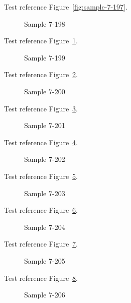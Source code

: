 Test reference Figure~\ref{fig:sample-7-197}.

\begin{figure}[tbhp]
\caption{Sample 7-198}
\label{fig:sample-7-198}
\end{figure}

Test reference Figure~\ref{fig:sample-7-198}.

\begin{figure}[tbhp]
\caption{Sample 7-199}
\label{fig:sample-7-199}
\end{figure}

Test reference Figure~\ref{fig:sample-7-199}.

\begin{figure}[tbhp]
\caption{Sample 7-200}
\label{fig:sample-7-200}
\end{figure}

Test reference Figure~\ref{fig:sample-7-200}.

\begin{figure}[tbhp]
\caption{Sample 7-201}
\label{fig:sample-7-201}
\end{figure}

Test reference Figure~\ref{fig:sample-7-201}.

\begin{figure}[tbhp]
\caption{Sample 7-202}
\label{fig:sample-7-202}
\end{figure}

Test reference Figure~\ref{fig:sample-7-202}.

\begin{figure}[tbhp]
\caption{Sample 7-203}
\label{fig:sample-7-203}
\end{figure}

Test reference Figure~\ref{fig:sample-7-203}.

\begin{figure}[tbhp]
\caption{Sample 7-204}
\label{fig:sample-7-204}
\end{figure}

Test reference Figure~\ref{fig:sample-7-204}.

\begin{figure}[tbhp]
\caption{Sample 7-205}
\label{fig:sample-7-205}
\end{figure}

Test reference Figure~\ref{fig:sample-7-205}.

\begin{figure}[tbhp]
\caption{Sample 7-206}
\label{fig:sample-7-206}
\end{figure}

